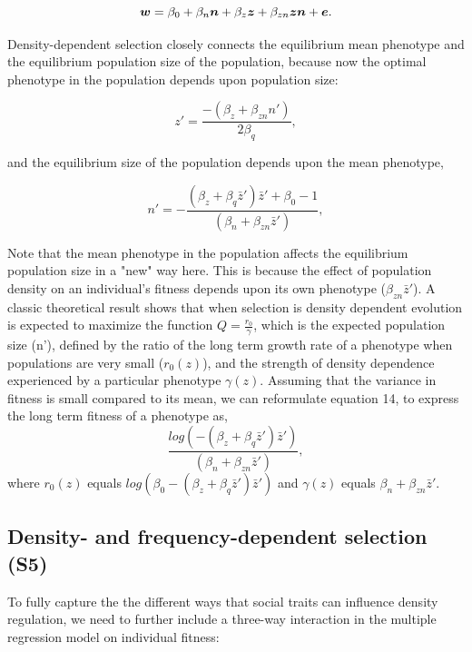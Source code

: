 \documentclass{article}
\begin{document}
\begin{equation} \label{eq: DDRS}
\vectorsym{w}=\beta_{0} +\beta_{n} \vectorsym{n} + \beta_{z} \vectorsym{z}+  \beta_{zn} \vectorsym{zn}  +  \vectorsym{e}.
\end{equation}

\noindent Density-dependent selection closely connects the equilibrium mean phenotype and the equilibrium population size of the population, because now the optimal phenotype in the population depends upon population size:

\begin{equation} 
z'=\frac{-(\beta_{z}+\beta_{zn}n')}{2\beta_{q}},
\end{equation} 

and the equilibrium size of the population depends upon the mean phenotype,

\begin{equation}
		n' = -\frac{(\beta_{z}  +  \beta_{q}\bar{z}')\bar{z}'+\beta_{0} -1}{(\beta_{n} +  \beta_{zn} \bar{z}')},
\end{equation}

\noindent Note that the mean phenotype in the population affects the equilibrium population size in a "new" way here. This is because the effect of population density on an individual's fitness depends upon its own phenotype ($\beta_{zn} \bar{z}'$). A classic theoretical result \citep{MacArthur1962, Engen2013} shows that when selection is density dependent evolution is expected to maximize the function $Q=\frac{r_0}{\gamma}$, which is the expected population size (n'), defined by the ratio of the long term growth rate of a phenotype when populations are very small ($r_0(z)$), and the strength of density dependence experienced by a particular phenotype $\gamma(z)$.  Assuming that the variance in fitness is small compared to its mean, we can reformulate equation 14, to express the long term fitness of a phenotype as,  $$\frac{log(-(\beta_{z}  +  \beta_{q}\bar{z}')\bar{z}')}{(\beta_{n} +  \beta_{zn} \bar{z}')},$$ where  $r_0(z)$ equals $log(\beta_{0}-(\beta_{z}  +  \beta_{q}\bar{z}')\bar{z}')$ and $\gamma(z)$ equals $\beta_{n} +  \beta_{zn} \bar{z}'$.

\subsection{Density- and frequency-dependent selection (S5)}

To fully capture the the different ways that social traits can influence density regulation, we need to further include a three-way interaction in the multiple regression model on individual fitness:
\end{document}
